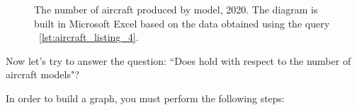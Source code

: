 \begin{figure*}[h]

    \setlength{\fboxsep}{0pt}%
    \setlength{\fboxrule}{1pt}%

	\caption[Number of aircraft produced by model, 2020.]{The number of aircraft produced by model, 2020. The diagram is built in Microsoft Excel based on the data obtained using the query ~\protect\ref{lst:aircraft_listing_4}.}%
    \label{fig:Number_of_aircraft_produced_en_2020}%
\end{figure*}

Now let's try to answer the question: ``Does  hold with respect to the 
number of aircraft models"?

In order to build a graph, you must perform the following steps:

